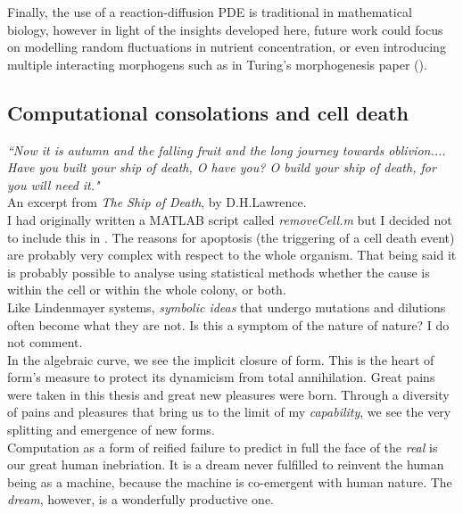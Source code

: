 Finally, the use of a reaction-diffusion PDE is traditional in mathematical biology, however
in light of the insights developed here, future work could focus on modelling 
random fluctuations in nutrient concentration, or even introducing multiple interacting 
morphogens such as in Turing's morphogenesis paper (\cite{turing1990chemical}).



\subsection{Computational consolations and cell death}

\textit{``Now it is autumn and the falling fruit
and the long journey towards oblivion....
Have you built your ship of death, O have you?
O build your ship of death, for you will need it."}
\\
An excerpt from \textit{The Ship of Death}, by D.H.Lawrence.
\\

I had originally written a MATLAB script called
\textit{removeCell.m} but I decided not to include this 
in . The reasons 
for apoptosis (the triggering of a cell death event)
are probably very complex with respect to the whole organism.
That being said it is probably possible 
to analyse using statistical methods whether 
the cause is within the cell or within the whole 
colony, or both.
\\

Like Lindenmayer systems, \textit{symbolic ideas} that undergo mutations
and dilutions often become what they are not. Is this a symptom 
of the nature of nature? I do not comment.
\\

In the algebraic curve, we see the implicit closure 
of form. This is the heart of form's measure 
to protect its dynamicism from total annihilation.
Great pains were taken in this thesis and great new pleasures were 
born. Through a diversity of pains and pleasures that 
bring us to the limit of my \textit{capability}, 
we see the very splitting and emergence of new forms.
\\

Computation as a form of reified failure to predict 
in full the face of the \textit{real} is 
our great human inebriation. It is a dream 
never fulfilled to reinvent the human being 
as a machine, because the machine is co-emergent with
human nature. The \textit{dream}, however, 
is a wonderfully productive one.



